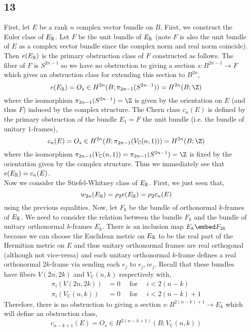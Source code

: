 \documentclass[12pt]{extarticle}
\newcommand{\C}{\mathbb{C}}
\begin{document}
\subsection{13}

First, let $E$ be a rank $n$ complex vector bundle on $B$. First, we construct the Euler class of $E_{\mathbb{R}}$. Let $F$ be the unit bundle of $E_{\mathbb{R}}$ (note $F$ is also the unit bundle of $E$ as a complex vector bundle since the complex norm and real norm coincide). Then $e(E_{\mathbb{R}})$ is the primary obstruction class of $F$ constructed as follows. The fiber of $F$ is $S^{2n - 1}$ so we have no obstruction to giving a section $s : B^{2n-1} \to F$ which gives an obstruction class for extending this section to $B^{2n}$,
\[ e(E_\R) = O_s \in H^{2n}(B; \pi_{2n-1}(S^{2n - 1})) = H^{2n}(B; \Z) \]
where the isomorphism $\pi_{2n - 1}(S^{2n - 1}) = \Z$ is given by the orientation on $E$ (and thus $F$) induced by the complex structure. The Chern class $c_n(E)$ is defined by the primary obstruction of the bundle $E_1 = F$ the unit bundle (i.e. the bundle of unitary $1$-frames),
\[ c_n(E) = O_s \in H^{2n}(B; \pi_{2n - 1}(V_\C(n, 1))) = H^{2n}(B; \Z) \]
where the isomorphism $\pi_{2n-1} (V_\C(n,1)) = \pi_{2n-1}(S^{2n - 1}) = \Z$ is fixed by the orientation given by the complex structure. Thus we immediately see that $e(E_{\mathbb{R}}) = c_n(E)$. 
\bigskip\\
Now we consider the Stiefel-Whitney class of $E_{\mathbb{R}}$. First, we just seen that,
\[ w_{2n}(E_{\mathbb{R}}) = \rho_2 e(E_{\mathbb{R}}) = \rho_2 c_n(E) \]
using the previous equalities. Now, let $F_k$ be the bundle of orthonormal $k$-frames of $E_{\mathbb{R}}$. We need to consider the relation between the bundle $F_k$ and the bundle of unitary orthonormal $k$-frames $E_k$. There is an inclusion map $E_k \embed F_{2k}$ because we can choose the Euclidean metric on $E_{\mathbb{R}}$ to be the real part of the Hermitian metric on $E$ and thus unitary orthonormal frames are real orthogonal (although not vice-versa) and each unitary orthonormal $k$-frame defines a real orthonormal $2k$-frame via sending each $e_j$ to $e_j, i e_j$. Recall that these bundles have fibers $V(2n, 2k)$ and $V_\C(n, k)$ respectively with,
\begin{align*}
\pi_i(V(2n, 2k)) &= 0 \quad \text{ for } \quad i < 2(n - k) 
\\
\pi_i(V_\C(n, k)) &= 0 \quad \text{ for } \quad i < 2 (n - k) + 1
\end{align*} 
Therefore, there is no obstruction to giving a section $s : B^{2 (n - k) + 1} \to E_k$ which will define an obstruction class,
\[ c_{n - k + 1}(E) = O_s \in H^{2(n - k + 1)}(B; V_\C(n, k)) \]
\end{document}
